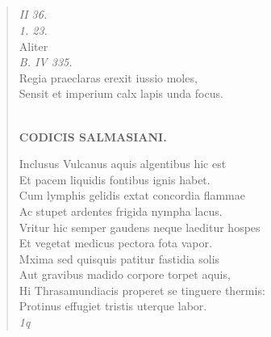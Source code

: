 \documentclass[11pt, a4paper]{report}
\begin{document}
            \subsection*{}
      \begin{verse}
      \textit{II 36.} \\ \textit{1. 23.} \\ Aliter \\ \textit{B. IV 335.} \\ Regia praeclaras erexit iussio moles, \\ Sensit et imperium calx lapis unda focus. \\ 
        ﻿\pagebreak 
    \begin{center} \textbf{CODICIS SALMASIANI.} \end{center} \marginpar{[181]} Inclusus Vulcanus aquis algentibus hic est \\ Et pacem liquidis fontibus ignis habet. \\ Cum lymphis gelidis extat concordia flammae \\ Ac stupet ardentes frigida nympha lacus. \\ Vritur hic semper gaudens neque laeditur hospes \\ Et vegetat medicus pectora fota vapor. \\ Mxima sed quisquis patitur fastidia solis \\ Aut gravibus madido corpore torpet aquis, \\ Hi Thrasamundiacis properet se tinguere thermis: \\ Protinus effugiet tristis uterque labor. \\ \textit{1q} \\ 
      \end{verse}
  
\end{document}
